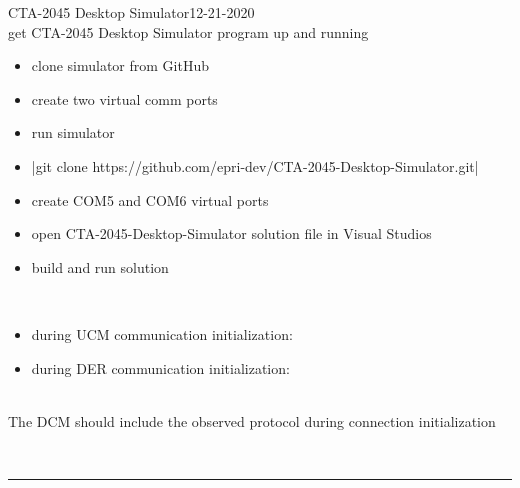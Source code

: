 \begin{entry}{CTA-2045 Desktop Simulator}{12-21-2020}
    \objective \\
    get CTA-2045 Desktop Simulator program up and running
    
    \outline
    \begin{itemize}
        \item clone simulator from GitHub
        \item create two virtual comm ports 
        \item run simulator
    \end{itemize}
    \procedures
    \begin{itemize}
        \item {}|git clone https://github.com/epri-dev/CTA-2045-Desktop-Simulator.git|
        \item create COM5 and COM6 virtual ports
        \item open CTA-2045-Desktop-Simulator solution file in Visual Studios
        \item build and run solution
    \end{itemize}
    \observations\\
    \begin{itemize}
        \item during UCM communication initialization:
        \item during DER communication initialization:
    \end{itemize}
    \results\\
    The DCM should include the observed protocol during connection initialization
\end{entry}
\\\noindent\rule{\textwidth}{1pt}
